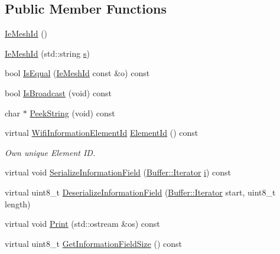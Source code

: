 \subsection*{Public Member Functions}
\begin{DoxyCompactItemize}
\item 
\hyperlink{classns3_1_1dot11s_1_1IeMeshId_a4512366bfe4f8f70c19c4f4cf741c4d7}{Ie\+Mesh\+Id} ()
\item 
\hyperlink{classns3_1_1dot11s_1_1IeMeshId_a5cf331832a0e285f513a4fadbf897a0e}{Ie\+Mesh\+Id} (std\+::string \hyperlink{generate__test__data__lte__sinr_8m_ad83eeb3a142285d1243a08c6b7026df8}{s})
\item 
bool \hyperlink{classns3_1_1dot11s_1_1IeMeshId_ab49849f9ac5db629cf720da385c74498}{Is\+Equal} (\hyperlink{classns3_1_1dot11s_1_1IeMeshId}{Ie\+Mesh\+Id} const \&o) const 
\item 
bool \hyperlink{classns3_1_1dot11s_1_1IeMeshId_afb6126ff54475df12f847a40648d5521}{Is\+Broadcast} (void) const 
\item 
char $\ast$ \hyperlink{classns3_1_1dot11s_1_1IeMeshId_a6f631ede0ea426d6c30e8aa241b6cd73}{Peek\+String} (void) const 
\item 
virtual \hyperlink{namespacens3_aeb185e0c8a60816016bca079f1420478}{Wifi\+Information\+Element\+Id} \hyperlink{classns3_1_1dot11s_1_1IeMeshId_a828cbcbed6a9a1303cfb716142ae994d}{Element\+Id} () const 
\begin{DoxyCompactList}\small\item\em Own unique Element ID. \end{DoxyCompactList}\item 
virtual void \hyperlink{classns3_1_1dot11s_1_1IeMeshId_acf452ad73ebdf75b12fc80862fd532a2}{Serialize\+Information\+Field} (\hyperlink{classns3_1_1Buffer_1_1Iterator}{Buffer\+::\+Iterator} \hyperlink{lte__uplink__power__control_8m_a6f6ccfcf58b31cb6412107d9d5281426}{i}) const 
\item 
virtual uint8\+\_\+t \hyperlink{classns3_1_1dot11s_1_1IeMeshId_aeffabe32bf155a57c71ff0e3132e32cc}{Deserialize\+Information\+Field} (\hyperlink{classns3_1_1Buffer_1_1Iterator}{Buffer\+::\+Iterator} start, uint8\+\_\+t length)
\item 
virtual void \hyperlink{classns3_1_1dot11s_1_1IeMeshId_a14ae9b0cfd9609e679cc3436e71bacfb}{Print} (std\+::ostream \&os) const 
\item 
virtual uint8\+\_\+t \hyperlink{classns3_1_1dot11s_1_1IeMeshId_a8c6820036a7f5e86d88737c7c2e6f4d6}{Get\+Information\+Field\+Size} () const 
\end{DoxyCompactItemize}
